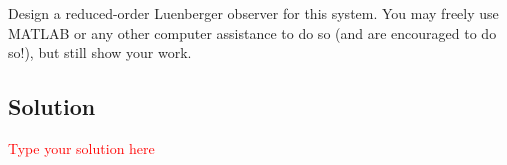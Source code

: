 \documentclass[11pt]{report}
\begin{document}
Design a reduced-order Luenberger observer for this system. You may freely use MATLAB or any other computer assistance to do so (and are encouraged to do so!), but still show your work.


\subsection*{Solution}
\textcolor{red}{Type your solution here}

\end{document}
